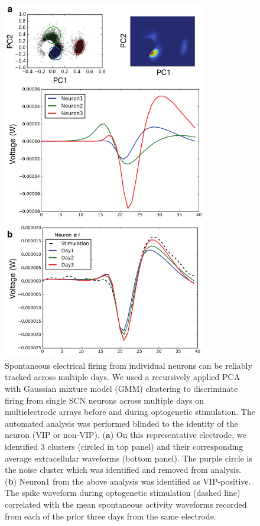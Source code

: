 \begin{figure}[p]
    \begin{center}
        \includegraphics[width=3.5in]{chap5/figures/SupplementaryFigure1.png}
    \end{center}
    \caption{\label{fig:cms1} Spontaneous electrical firing from individual neurons can be reliably tracked across multiple days. We used a recursively applied PCA with Gaussian mixture model (GMM) clustering to discriminate firing from single SCN neurons across multiple days on multielectrode arrays before and during optogenetic stimulation. The automated analysis was performed blinded to the identity of the neuron (VIP or non-VIP). 
    (\textbf{a}) On this representative electrode, we identified 3 clusters (circled in top panel) and their corresponding average extracellular waveforms (bottom panel). The purple circle is the noise cluster which was identified and removed from analysis.
    (\textbf{b}) Neuron1 from the above analysis was identified as VIP-positive. The spike waveform during optogenetic stimulation (dashed line) correlated with the mean spontaneous activity waveforms recorded from each of the prior three days from the same electrode. 
    }
\end{figure}


